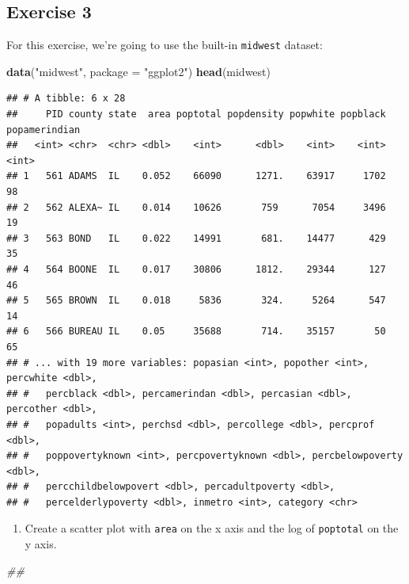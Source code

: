 \documentclass[
]{book}
\newenvironment{Shaded}{\begin{snugshade}}{\end{snugshade}}
\newcommand{\CommentTok}[1]{\textcolor[rgb]{0.56,0.35,0.01}{\textit{#1}}}
\newcommand{\DataTypeTok}[1]{\textcolor[rgb]{0.13,0.29,0.53}{#1}}
\newcommand{\KeywordTok}[1]{\textcolor[rgb]{0.13,0.29,0.53}{\textbf{#1}}}
\newcommand{\NormalTok}[1]{#1}
\newcommand{\StringTok}[1]{\textcolor[rgb]{0.31,0.60,0.02}{#1}}
\providecommand{\tightlist}{%
  \setlength{\itemsep}{0pt}\setlength{\parskip}{0pt}}
\begin{document}
\hypertarget{exercise-3-2}{%
\subsection{Exercise 3}\label{exercise-3-2}}

For this exercise, we're going to use the built-in \texttt{midwest} dataset:

\begin{Shaded}
\begin{Highlighting}[]
\KeywordTok{data}\NormalTok{(}\StringTok{"midwest"}\NormalTok{, }\DataTypeTok{package =} \StringTok{"ggplot2"}\NormalTok{)}
\KeywordTok{head}\NormalTok{(midwest)}
\end{Highlighting}
\end{Shaded}

\begin{verbatim}
## # A tibble: 6 x 28
##     PID county state  area poptotal popdensity popwhite popblack popamerindian
##   <int> <chr>  <chr> <dbl>    <int>      <dbl>    <int>    <int>         <int>
## 1   561 ADAMS  IL    0.052    66090      1271.    63917     1702            98
## 2   562 ALEXA~ IL    0.014    10626       759      7054     3496            19
## 3   563 BOND   IL    0.022    14991       681.    14477      429            35
## 4   564 BOONE  IL    0.017    30806      1812.    29344      127            46
## 5   565 BROWN  IL    0.018     5836       324.     5264      547            14
## 6   566 BUREAU IL    0.05     35688       714.    35157       50            65
## # ... with 19 more variables: popasian <int>, popother <int>, percwhite <dbl>,
## #   percblack <dbl>, percamerindan <dbl>, percasian <dbl>, percother <dbl>,
## #   popadults <int>, perchsd <dbl>, percollege <dbl>, percprof <dbl>,
## #   poppovertyknown <int>, percpovertyknown <dbl>, percbelowpoverty <dbl>,
## #   percchildbelowpovert <dbl>, percadultpoverty <dbl>,
## #   percelderlypoverty <dbl>, inmetro <int>, category <chr>
\end{verbatim}

\begin{enumerate}
\def\labelenumi{\arabic{enumi}.}
\tightlist
\item
  Create a scatter plot with \texttt{area} on the x axis and the log of \texttt{poptotal} on the y axis.
\end{enumerate}

\begin{Shaded}
\begin{Highlighting}[]
\CommentTok{\#\# }
\end{Highlighting}
\end{Shaded}
\end{document}
